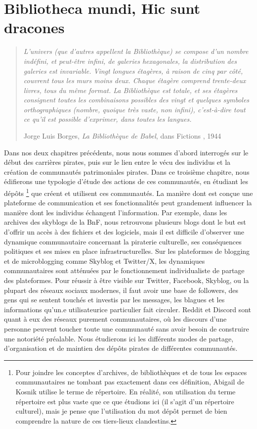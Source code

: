 \chapter{Bibliotheca mundi, Hic sunt dracones}

\begin{quote}
    \textit{L'univers (que d'autres appellent la Bibliothèque) se compose d'un nombre indéfini, et peut-être infini, de galeries hexagonales, la distribution des galeries est invariable. Vingt longues étagères, à raison de cinq par côté, couvrent tous les murs moins deux. Chaque étagère comprend trente-deux livres, tous du même format. La Bibliothèque est totale, et ses étagères consignent toutes les combinaisons possibles des vingt et quelques symboles orthographiques (nombre, quoique très vaste, non infini), c'est-à-dire tout ce qu'il est possible d'exprimer, dans toutes les langues.}

    Jorge Luis Borges, \textit{La Bibliothèque de Babel}, dans \og Fictions \fg, 1944
\end{quote}

Dans nos deux chapitres précédents, nous nous sommes d'abord interrogés sur le début des carrières pirates, puis sur le lien entre le vécu des individus et la création de communautés patrimoniales pirates. Dans ce troisième chapitre, nous édifierons une typologie d'étude des actions de ces communautés, en étudiant les dépôts \footnote{Pour joindre les conceptes d'archives, de bibliothèques et de tous les espaces communautaires ne tombant pas exactement dans ces définition, Abigail de Kosnik utilise le terme de répertoire. En réalité, son utilisation du terme répertoire est plus vaste que ce que étudions ici (il s'agit d'un répertoire culturel), mais je pense que l'utilisation du mot dépôt permet de bien comprendre la nature de ces tiers-lieux clandestins.} que créent et utilisent ces communautés. La manière dont est conçue une plateforme de communication et ses fonctionnalités peut grandement influencer la manière dont les individus échangent l'information. Par exemple, dans les archives des skyblogs de la BnF, nous retrouvons plusieurs blogs dont le but est d’offrir un accès à des fichiers et des logiciels, mais il est difficile d'observer une dynamique communautaire concernant la piraterie culturelle, ses conséquences politiques et ses mises en place infrastructurelles. Sur les plateformes de blogging et de microblogging comme Skyblog et Twitter/X, les dynamiques communautaires sont atténuées par le fonctionnement individualiste de partage des plateformes. Pour réussir à être visible sur Twitter, Facebook, Skyblog, ou la plupart des réseaux sociaux modernes, il faut avoir une base de followers, des gens qui se sentent touchés et investis par les messages, les blagues et les informations qu'un.e utilisateurice particulier fait circuler. Reddit et Discord sont quant à eux des réseaux purement communautaires, où les discours d'une personne peuvent toucher toute une communauté sans avoir besoin de construire une notoriété préalable. Nous étudierons ici les différents modes de partage, d'organisation et de maintien des dépôts pirates de différentes communautés.

